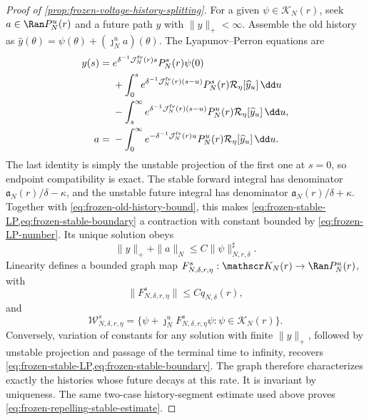\begin{proof}[Proof of \cref{prop:frozen-voltage-history-splitting}]
For a given \(\psi\in\mathscr K_N(r)\), seek
\(a\in\Ran P_N^u(r)\) and a future path \(y\) with \(\|y\|_+<\infty\).
Assemble the old history as
\(\widehat y(\theta)=\psi(\theta)+(\jmath_N^ua)(\theta)\).  The
Lyapunov--Perron equations are
\begin{align}
 y(s)={}&e^{\delta^{-1}\mathcal J_N^{\rm fv}(r)s}
              P_N^s(r)\psi(0)\notag\\
 &+\int_0^s e^{\delta^{-1}\mathcal J_N^{\rm fv}(r)(s-u)}P_N^s(r)
       \mathcal R_\eta[\widehat y_u]\,\dd u\notag\\
 &-\int_s^\infty e^{\delta^{-1}\mathcal J_N^{\rm fv}(r)(s-u)}P_N^u(r)
       \mathcal R_\eta[\widehat y_u]\,\dd u,        \label{eq:frozen-stable-LP}\\
 a={}&-\int_0^\infty
       e^{-\delta^{-1}\mathcal J_N^{\rm fv}(r)u}P_N^u(r)
       \mathcal R_\eta[\widehat y_u]\,\dd u.        \label{eq:frozen-stable-boundary}
\end{align}
The last identity is simply the unstable projection of the first one at
\(s=0\), so endpoint compatibility is exact.  The stable forward integral
has denominator
\(\mathfrak a_N(r)/\delta-\kappa\), and the unstable future integral has
denominator \(\mathfrak a_N(r)/\delta+\kappa\).  Together with
\cref{eq:frozen-old-history-bound}, this makes
\cref{eq:frozen-stable-LP,eq:frozen-stable-boundary} a contraction with
constant bounded by \cref{eq:frozen-LP-number}.  Its unique solution obeys
\begin{equation}
 \|y\|_++\|a\|_N
 \le C\|\psi\|_{N,r,\delta}^{\sharp}.               \label{eq:frozen-stable-LP-bound}
\end{equation}
Linearity defines a bounded graph map
\(F^s_{N,\delta,r,\eta}:\mathscr K_N(r)\to\Ran P_N^u(r)\), with
\begin{equation}
 \|F^s_{N,\delta,r,\eta}\|
 \le Cq_{N,\delta}(r),                               \label{eq:frozen-stable-graph-small}
\end{equation}
and
\begin{equation}
 \mathscr W^s_{N,\delta,r,\eta}
 =\{\psi+\jmath_N^uF^s_{N,\delta,r,\eta}\psi:
                 \psi\in\mathscr K_N(r)\}.         \label{eq:frozen-stable-history-graph}
\end{equation}
Conversely, variation of constants for any solution with finite
\(\|y\|_+\), followed by unstable projection and passage of the terminal
time to infinity, recovers
\cref{eq:frozen-stable-LP,eq:frozen-stable-boundary}.  The graph therefore
characterizes exactly the histories whose future decays at this rate.  It is
invariant by uniqueness.  The same two-case history-segment estimate used
above proves \cref{eq:frozen-repelling-stable-estimate}.


\end{proof}
